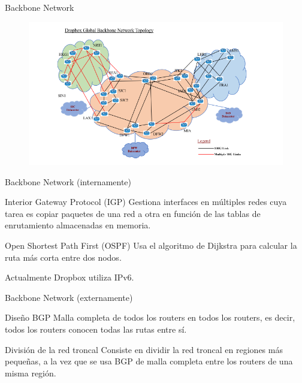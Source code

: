\documentclass[10pt]{beamer}
\begin{document}
\begin{frame}{Backbone Network}
\begin{figure}[h]
  \centering
  \includegraphics[width=1\linewidth]{backbone}
\end{figure}
\end{frame}

\begin{frame}{Backbone Network (internamente)}
\begin{alertblock}{Interior Gateway Protocol (IGP)}
Gestiona interfaces en múltiples redes cuya tarea es copiar paquetes de una red a otra en función de las tablas de enrutamiento almacenadas en memoria.
\end{alertblock}
\begin{alertblock}{Open Shortest Path First (OSPF)}
Usa el algoritmo de Dijkstra para calcular la ruta más corta entre dos nodos.
\end{alertblock}
Actualmente Dropbox utiliza IPv6.
\end{frame}

\begin{frame}{Backbone Network (externamente)}
\begin{alertblock}{Diseño BGP}
Malla completa de todos los routers en todos los routers, es decir, todos los routers conocen todas las rutas entre sí.
\end{alertblock}
\begin{alertblock}{División de la red troncal}
Consiste en dividir la red troncal en regiones más pequeñas, a la vez que se usa BGP de malla completa entre los routers de una misma región.
\end{alertblock}
\end{frame}
\end{document}
